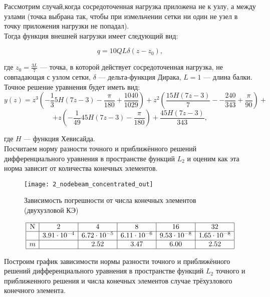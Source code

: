 \documentclass[12pt,a4paper]{article}
\begin{document}
Рассмотрим случай,когда сосредоточенная нагрузка приложена не к узлу, а между узлами (точка выбрана так, чтобы при измельчении сетки ни один не узел в точку приложения нагрузки не попадал).  \\

Тогда функция внешней нагрузки имеет следующий вид:

$$q = 10 Q L  \delta (z - z_{0}),$$

где $z_{0}=\frac{3L}{7}$ --- точка, в которой действует сосредоточенная нагрузка, не совпадающая с узлом сетки, $\delta$ --- дельта-функция Дирака, $L=1$ --- длина балки. \\

Точное решение уравнения будет иметь вид:
$$
	y(z)= z^3 \left(-\frac{1}{3} 5 H (7 z-3)-\frac{\pi }{180}+\frac{1040}{1029}\right)+z^2 \left(\frac{15 H (7 z-3)}{7}-
-\frac{240}{343}+\frac{\pi }{90}\right)+$$
$$+z \left(-\frac{1}{49} 45 H (7 z-3)-\frac{\pi }{180}\right)+\frac{45 H (7 z-3)}{343},
$$

где $H$ --- функция Хевисайда.\\

Посчитаем норму разности точного и приближённого решений дифференциального уравнения в пространстве функций $L_{2}$  и оценим как эта норма зависит от количества конечных элементов.\\

\begin{figure}[H]
		\centering
		\texttt{[image: 2\_nodebeam\_concentrated\_out]}
		\caption{Зависимость погрешности от числа конечных элементов (двухузловой КЭ)}
		\label{fig:2_nodebeam_concentrated_out}
	\end{figure}

\[
\begin{array}{|c|c|c|c|c|c|}
\hline
\text{N} & 2 & 4 & 8 & 16 & 32\\ \hline
\Delta  &3.91 \cdot 10^{-4} & 6.72 \cdot 10^{-5} & 6.11 \cdot 10^{-6} & 9.53 \cdot 10^{-8} & 1.65 \cdot 10^{-8} \\ \hline
m  &  & 2.52 & 3.47 & 6.00 & 2.52 \\ 
\hline
\end{array}
\]

Построим график зависимости нормы разности точного и приближённого решений дифференциального уравнения в пространстве функций $L_{2}$ точного и приближенного решения и числа конечных элементов случае трёхузлового конечного элемента. 
\end{document}
